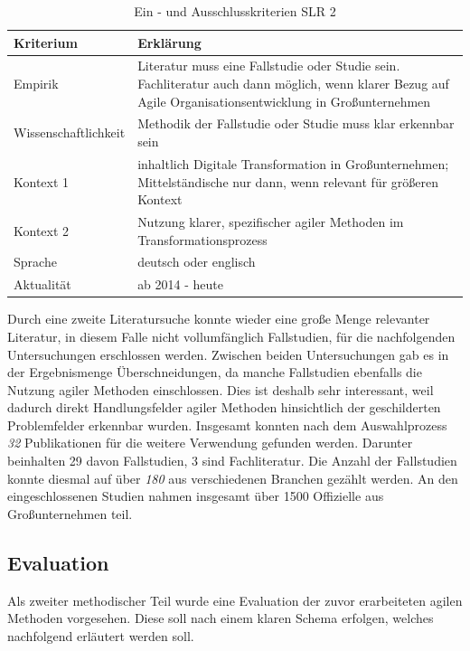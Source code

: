 \begin{table}[ht]
	\centering
	\caption{Ein - und Ausschlusskriterien SLR 2}
	\begin{tabular}{|p{4cm}|p{8cm}|}
		\hline
		\textbf{Kriterium}& \textbf{Erklärung}  \\
		\hline
		Empirik & Literatur muss eine Fallstudie oder Studie sein. Fachliteratur auch dann möglich, wenn klarer Bezug auf Agile Organisationsentwicklung in Großunternehmen \\
		Wissenschaftlichkeit & Methodik der  Fallstudie oder Studie muss klar erkennbar sein \\
		Kontext 1 & inhaltlich Digitale Transformation in Großunternehmen; Mittelständische nur dann, wenn relevant für größeren Kontext \\
		Kontext 2 & Nutzung klarer, spezifischer agiler Methoden im Transformationsprozess \\
		Sprache & deutsch oder englisch \\
		Aktualität & ab 2014 - heute  \\
		\hline
	\end{tabular}
	\label{tab:criteriaslr2}
\end{table}

Durch eine zweite Literatursuche konnte wieder eine große Menge relevanter Literatur, in diesem Falle nicht vollumfänglich Fallstudien, für die nachfolgenden Untersuchungen erschlossen werden. Zwischen beiden Untersuchungen gab es in der Ergebnismenge Überschneidungen, da manche Fallstudien ebenfalls die Nutzung agiler Methoden einschlossen. Dies ist deshalb sehr interessant, weil dadurch direkt Handlungsfelder agiler Methoden hinsichtlich der geschilderten Problemfelder erkennbar wurden. Insgesamt konnten nach dem Auswahlprozess \textit{32} Publikationen für die weitere Verwendung gefunden werden. Darunter beinhalten 29 davon Fallstudien, 3 sind Fachliteratur. Die Anzahl der Fallstudien konnte diesmal auf über \textit{180} aus verschiedenen Branchen gezählt werden. An den eingeschlossenen Studien nahmen insgesamt über 1500 Offizielle aus Großunternehmen teil. 

\subsection{Evaluation}

Als zweiter methodischer Teil wurde eine Evaluation der zuvor erarbeiteten agilen Methoden vorgesehen. Diese soll nach einem klaren Schema erfolgen, welches nachfolgend erläutert werden soll. 

